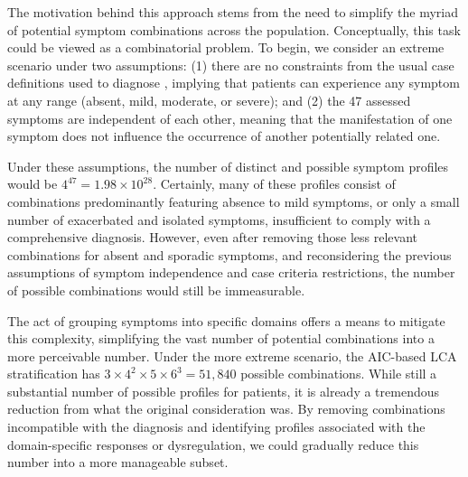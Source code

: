 
\bsni
The motivation behind this approach stems from the need to simplify the myriad of potential symptom combinations across the \cfs population.
Conceptually, this task could be viewed as a combinatorial problem.
To begin, we consider an extreme scenario under two assumptions: (1) there are no constraints from the usual case definitions used to diagnose \cfs, implying that patients 
can experience any symptom at any range (absent, mild, moderate, or severe); and (2) the 47 assessed symptoms are independent of each other, meaning that the manifestation of one symptom does not influence the occurrence of another potentially related one.

Under these assumptions, the number of distinct and possible symptom profiles would be $4^{47} = 1.98 \times 10^{28}$.
Certainly, many of these profiles consist of combinations predominantly featuring absence to mild symptoms, or only a small number of exacerbated and isolated symptoms, insufficient to comply with a comprehensive \cfs diagnosis.
However, even after removing those less relevant combinations for absent and sporadic symptoms, and reconsidering the previous assumptions of symptom independence and case criteria restrictions, the number of possible combinations would still be immeasurable.

The act of grouping symptoms into specific domains offers a means to mitigate this complexity, simplifying the vast number of potential combinations into a more perceivable number.
Under the more extreme scenario, the AIC-based LCA stratification has $3 \times 4^2 \times 5 \times 6^3 = 51,840$ possible combinations.
While still a substantial number of possible profiles for \cfs patients, it is already a tremendous reduction from what the original consideration was.
By removing combinations incompatible with the diagnosis and identifying profiles associated with the domain-specific responses or dysregulation, we could gradually reduce this number into a more manageable subset.

